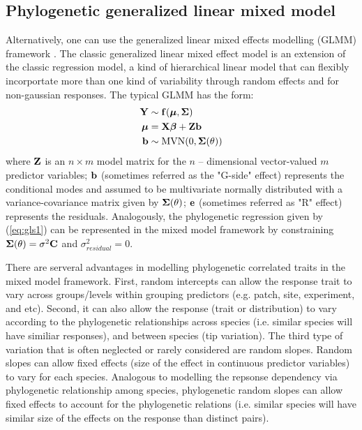 \documentclass[12pt]{article}
\begin{document}
\subsection{Phylogenetic generalized linear mixed model}
Alternatively, one can use the generalized linear mixed effects modelling (GLMM) framework \citep{lynch1991methods}.
The classic generalized linear mixed effect model is an extension of the classic regression model, a kind of hierarchical linear model that can flexibly incorportate more than one kind of variability through random effects and for non-gaussian responses.
The typical GLMM has the form:
\begin{align}
{\mathbf Y} & \sim \mathbf{f}({\boldsymbol \mu},{\boldsymbol \Sigma}) \label{eq:glmm1} \\
{\boldsymbol \mu} & = {\mathbf X} {\boldsymbol \beta} + {\mathbf Z} {\mathbf b}  \label{eq:glmm2} \\
{\mathbf b} & \sim \textrm{MVN}(0, {\boldsymbol \Sigma}(\theta)) \label{eq:glmm3} \\
\end{align}
where ${\mathbf Z}$ is an $n \times m$ model matrix for the $n$ -- dimensional vector-valued $m$ predictor variables; ${\mathbf b}$ (sometimes referred as the "G-side" effect) represents the conditional modes and assumed to be multivariate normally distributed with a variance-covariance matrix given by ${\boldsymbol \Sigma}(\theta)$; ${\mathbf e}$ (sometimes referred as "R" effect) represents the residuals. %
Analogously, the phylogenetic regression given by (\ref{eq:gls1}) can be represented in the mixed model framework by constraining ${\boldsymbol \Sigma}(\theta) = \sigma^2 {\mathbf C}$ and $\sigma^2_{residual} = 0$.

There are serveral advantages in modelling phylogenetic correlated traits in the mixed model framework.
First, random intercepts can allow the response trait to vary across groups/levels within grouping predictors (e.g. patch, site, experiment, and etc). 
Second, it can also allow the response (trait or distribution) to vary according to the phylogenetic relationships across species (i.e. similar species will have similiar responses), and between species (tip variation).
The third type of variation that is often neglected or rarely considered are random slopes.
Random slopes can allow fixed effects (size of the effect in continuous predictor variables) to vary for each species. 
Analogous to modelling the repsonse dependency via phylogenetic relationship among species, phylogenetic random slopes can allow fixed effects to account for the phylogenetic relations (i.e. similar species will have similar size of the effects on the response than distinct pairs).
\end{document}
